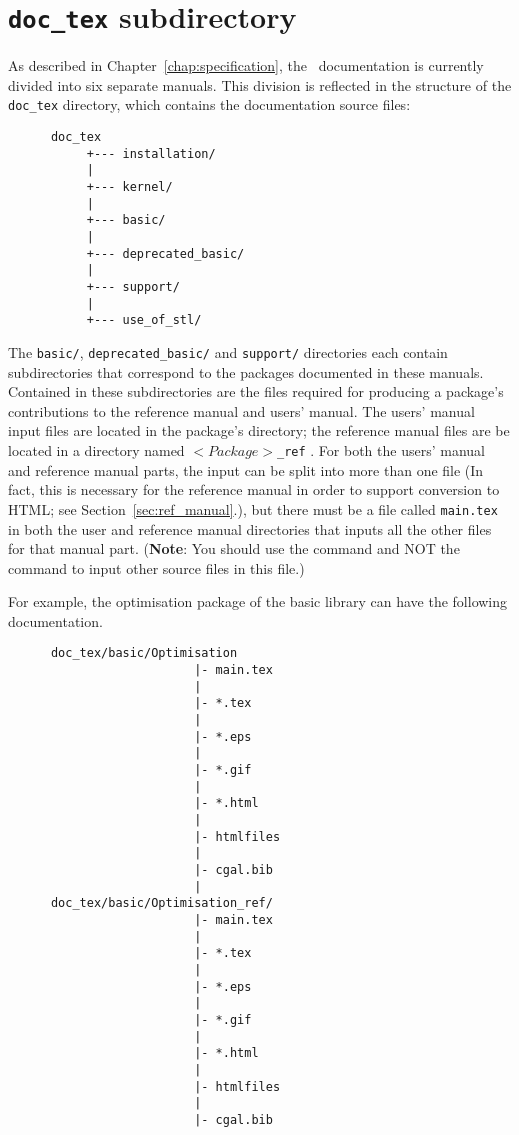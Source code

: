 \section{{\tt doc\_tex} subdirectory}
\label{sec:doc_tex_subdirectory}

As described in Chapter~\ref{chap:specification}, the \cgal\ documentation is
currently divided into six separate manuals.  This division is reflected
in the structure of the {\tt doc\_tex} directory, which contains the 
documentation source files: 
\begin{verbatim}
      doc_tex
           +--- installation/
           |
           +--- kernel/
           |
           +--- basic/
           |
           +--- deprecated_basic/
           |
           +--- support/
           |
           +--- use_of_stl/
\end{verbatim}

The {\tt basic/}, {\tt deprecated\_basic/} and {\tt support/} directories each 
contain subdirectories
that correspond to the packages documented in these manuals.  Contained in these
subdirectories are the files required for producing a package's contributions
to the reference manual and users' manual. The users' manual input files are
located in the package's directory; the reference manual files are
be located in a directory named $<Package>${\tt \_ref}
.  
For both the users' manual and reference manual parts, the input can be
split into more than one file (In fact, this is necessary for the reference
manual in order to support conversion to HTML; 
see Section~\ref{sec:ref_manual}.), but there must be a file called 
{\tt main.tex} in both the user and reference manual directories that inputs 
all the other files for that manual part.
({\bf Note}: You should use the \verb|| command and NOT the 
\verb|| command to input other source files in this file.)  

For example, the optimisation package of 
the basic library can have the following documentation. 
\begin{verbatim}
      doc_tex/basic/Optimisation
                          |- main.tex
                          |
                          |- *.tex
                          |
                          |- *.eps
                          |
                          |- *.gif
                          |
                          |- *.html
                          |
                          |- htmlfiles
                          |
                          |- cgal.bib
                          |
      doc_tex/basic/Optimisation_ref/
                          |- main.tex
                          |
                          |- *.tex
                          |
                          |- *.eps
                          |
                          |- *.gif
                          |
                          |- *.html
                          |
                          |- htmlfiles
                          |
                          |- cgal.bib
\end{verbatim}

